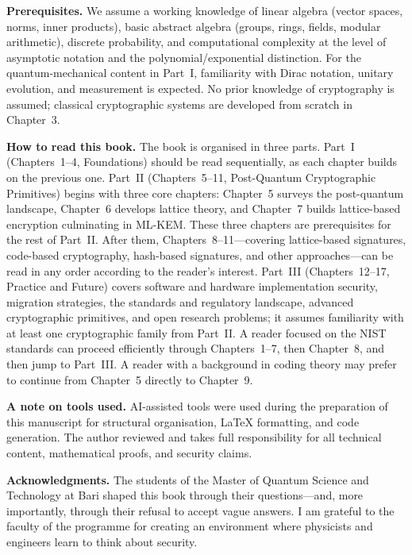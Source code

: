 \medskip
\noindent\textbf{Prerequisites.}\enspace
We assume a working knowledge of linear algebra (vector spaces, norms, inner products), basic abstract algebra (groups, rings, fields, modular arithmetic), discrete probability, and computational complexity at the level of asymptotic notation and the polynomial/exponential distinction.  For the quantum-mechanical content in Part~I, familiarity with Dirac notation, unitary evolution, and measurement is expected.  No prior knowledge of cryptography is assumed; classical cryptographic systems are developed from scratch in Chapter~3.

\medskip
\noindent\textbf{How to read this book.}\enspace
The book is organised in three parts.  Part~I (Chapters~1--4, Foundations) should be read sequentially, as each chapter builds on the previous one.  Part~II (Chapters~5--11, Post-Quantum Cryptographic Primitives) begins with three core chapters: Chapter~5 surveys the post-quantum landscape, Chapter~6 develops lattice theory, and Chapter~7 builds lattice-based encryption culminating in ML-KEM.  These three chapters are prerequisites for the rest of Part~II.  After them, Chapters~8--11---covering lattice-based signatures, code-based cryptography, hash-based signatures, and other approaches---can be read in any order according to the reader's interest.  Part~III (Chapters~12--17, Practice and Future) covers software and hardware implementation security, migration strategies, the standards and regulatory landscape, advanced cryptographic primitives, and open research problems; it assumes familiarity with at least one cryptographic family from Part~II.  A reader focused on the NIST standards can proceed efficiently through Chapters~1--7, then Chapter~8, and then jump to Part~III.  A reader with a background in coding theory may prefer to continue from Chapter~5 directly to Chapter~9.

\medskip
\noindent\textbf{A note on tools used.}\enspace
AI-assisted tools were used during the preparation of this manuscript for structural organisation, \LaTeX{} formatting, and code generation.  The author reviewed and takes full responsibility for all technical content, mathematical proofs, and security claims.

\medskip
\noindent\textbf{Acknowledgments.}\enspace
The students of the Master of Quantum Science and Technology at Bari shaped this book through their questions---and, more importantly, through their refusal to accept vague answers.  I am grateful to the faculty of the programme for creating an environment where physicists and engineers learn to think about security.


